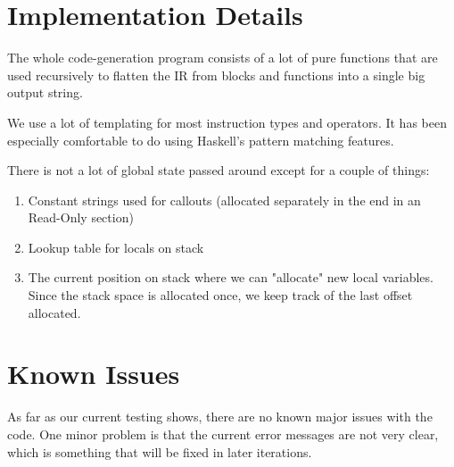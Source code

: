 \documentclass[11pt]{article}
\begin{document}
\section{Implementation Details}

\par The whole code-generation program consists of a lot of pure functions that are used recursively to flatten the IR from blocks and functions into a single big output string.

\par We use a lot of templating for most instruction types and operators. It has been especially comfortable to do using Haskell's pattern matching features.

\par There is not a lot of global state passed around except for a couple of things:

\begin{enumerate}
\item Constant strings used for callouts (allocated separately in the end in an Read-Only section)
\item Lookup table for locals on stack
\item The current position on stack where we can "allocate" new local variables. Since the stack space is allocated once, we keep track of the last offset allocated.
\end{enumerate}

\section{Known Issues}

\par As far as our current testing shows, there are no known major issues with the code. One minor problem is that the current error messages are not very clear, which is something that will be fixed in later iterations.
\end{document}

